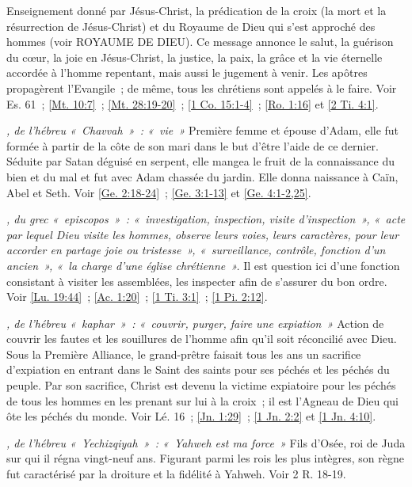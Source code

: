 \begin{multicols}{2}
\textit{}\newline
Enseignement donné par Jésus-Christ, la prédication de la croix (la mort et la résurrection de Jésus-Christ) et du Royaume de Dieu qui s'est approché des hommes (voir ROYAUME DE DIEU). Ce message annonce le salut, la guérison du cœur, la joie en Jésus-Christ, la justice, la paix, la grâce et la vie éternelle accordée à l'homme repentant, mais aussi le jugement à venir. Les apôtres propagèrent l'Evangile~; de même, tous les chrétiens sont appelés à le faire. Voir Es. 61~; \vref{Mt. 10:7}~; \vref{Mt. 28:19-20}~; \vref{1 Co. 15:1-4}~; \vref{Ro. 1:16} et \vref{2 Ti. 4:1}.

\textit{, de l'hébreu «~Chavvah~»~: «~vie~»}\newline
Première femme et épouse d'Adam, elle fut formée à partir de la côte de son mari dans le but d'être l'aide de ce dernier. Séduite par Satan déguisé en serpent, elle mangea le fruit de la connaissance du bien et du mal et fut avec Adam chassée du jardin. Elle donna naissance à Caïn, Abel et Seth. Voir \vref{Ge. 2:18-24}~; \vref{Ge. 3:1-13} et \vref{Ge. 4:1-2,25}.

\textit{, du grec «~episcopos~»~: «~investigation, inspection, visite d'inspection~», «~acte par lequel Dieu visite les hommes, observe leurs voies, leurs caractères, pour leur accorder en partage joie ou tristesse~», «~surveillance, contrôle, fonction d'un ancien~», «~la charge d'une église chrétienne~».}\newline
Il est question ici d'une fonction consistant à visiter les assemblées, les inspecter afin de s'assurer du bon ordre. Voir \vref{Lu. 19:44}~; \vref{Ac. 1:20}~; \vref{1 Ti. 3:1}~; \vref{1 Pi. 2:12}.

\textit{, de l'hébreu «~kaphar~»~: «~couvrir, purger, faire une expiation~»}\newline
Action de couvrir les fautes et les souillures de l'homme afin qu'il soit réconcilié avec Dieu. Sous la Première Alliance, le grand-prêtre faisait tous les ans un sacrifice d'expiation en entrant dans le Saint des saints pour ses péchés et les péchés du peuple. Par son sacrifice, Christ est devenu la victime expiatoire pour les péchés de tous les hommes en les prenant sur lui à la croix~; il est l'Agneau de Dieu qui ôte les péchés du monde. Voir Lé. 16~; \vref{Jn. 1:29}~; \vref{1 Jn. 2:2} et \vref{1 Jn. 4:10}.

\textit{, de l'hébreu «~Yechizqiyah~»~: «~Yahweh est ma force~»}\newline
Fils d'Osée, roi de Juda sur qui il régna vingt-neuf ans. Figurant parmi les rois les plus intègres, son règne fut caractérisé par la droiture et la fidélité à Yahweh. Voir 2 R. 18-19.


\end{multicols}
